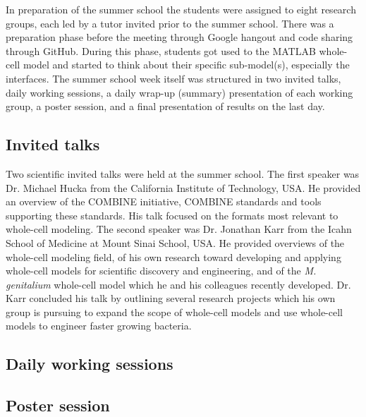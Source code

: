 \documentclass[journal,transmag]{IEEEtran}
\begin{document}

In preparation of the summer school the students were assigned to eight research groups, each led by a tutor invited prior to the summer school. 
There was a preparation phase before the meeting through Google hangout and code sharing through GitHub. During this phase, students got used to the MATLAB whole-cell model and started to think about their specific sub-model(s), especially the interfaces.
The summer school week itself was structured in two invited talks, daily working sessions, a daily wrap-up (summary) presentation of each working group, a poster session, and a final presentation of results on the last day.




\subsection{Invited talks}
Two scientific invited talks were held at the summer school. 
The first speaker was Dr. Michael Hucka from the California Institute of Technology, USA. 
He provided an overview of the COMBINE initiative, COMBINE standards and tools supporting these standards. 
His talk focused on the formats most relevant to whole-cell modeling. 
The second speaker was Dr. Jonathan Karr from the Icahn School of Medicine at Mount Sinai School, USA. 
He  provided overviews of the whole-cell modeling field, of his own research toward developing and applying whole-cell models for scientific discovery and engineering, and of the \textit{M. genitalium} whole-cell model which he and his colleagues recently developed.
Dr. Karr concluded his talk by outlining several research projects which his own group is pursuing to expand the scope of whole-cell models and use whole-cell models to engineer faster growing bacteria.

\subsection{Daily working sessions}

\subsection{Poster session}
\end{document}
